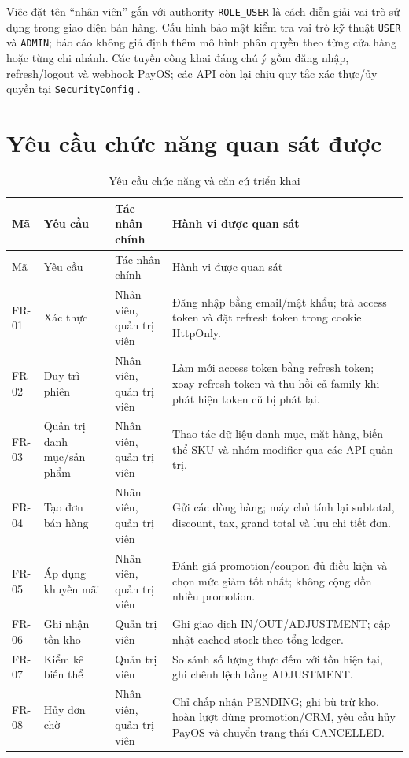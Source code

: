 \documentclass[12pt,a4paper,oneside]{report}
\begin{document}
Việc đặt tên “nhân viên” gắn với authority \texttt{ROLE\_USER} là cách diễn giải vai trò sử dụng trong giao diện bán hàng. Cấu hình bảo mật kiểm tra vai trò kỹ thuật \texttt{USER} và \texttt{ADMIN}; báo cáo không giả định thêm mô hình phân quyền theo từng cửa hàng hoặc từng chi nhánh. Các tuyến công khai đáng chú ý gồm đăng nhập, refresh/logout và webhook PayOS; các API còn lại chịu quy tắc xác thực/ủy quyền tại \texttt{SecurityConfig} \cite{authcode}.

\section{Yêu cầu chức năng quan sát được}
\begin{longtable}{@{}p{1.5cm}p{4.2cm}p{3.0cm}p{6.0cm}@{}}
\caption{Yêu cầu chức năng và căn cứ triển khai}\\
\toprule Mã & Yêu cầu & Tác nhân chính & Hành vi được quan sát\\\midrule
\endfirsthead
\toprule Mã & Yêu cầu & Tác nhân chính & Hành vi được quan sát\\\midrule
\endhead
\bottomrule
\endfoot
FR-01 & Xác thực & Nhân viên, quản trị viên & Đăng nhập bằng email/mật khẩu; trả access token và đặt refresh token trong cookie HttpOnly.\\
FR-02 & Duy trì phiên & Nhân viên, quản trị viên & Làm mới access token bằng refresh token; xoay refresh token và thu hồi cả family khi phát hiện token cũ bị phát lại.\\
FR-03 & Quản trị danh mục/sản phẩm & Nhân viên, quản trị viên & Thao tác dữ liệu danh mục, mặt hàng, biến thể SKU và nhóm modifier qua các API quản trị.\\
FR-04 & Tạo đơn bán hàng & Nhân viên, quản trị viên & Gửi các dòng hàng; máy chủ tính lại subtotal, discount, tax, grand total và lưu chi tiết đơn.\\
FR-05 & Áp dụng khuyến mãi & Nhân viên, quản trị viên & Đánh giá promotion/coupon đủ điều kiện và chọn mức giảm tốt nhất; không cộng dồn nhiều promotion.\\
FR-06 & Ghi nhận tồn kho & Quản trị viên & Ghi giao dịch IN/OUT/ADJUSTMENT; cập nhật cached stock theo tổng ledger.\\
FR-07 & Kiểm kê biến thể & Quản trị viên & So sánh số lượng thực đếm với tồn hiện tại, ghi chênh lệch bằng ADJUSTMENT.\\
FR-08 & Hủy đơn chờ & Nhân viên, quản trị viên & Chỉ chấp nhận PENDING; ghi bù trừ kho, hoàn lượt dùng promotion/CRM, yêu cầu hủy PayOS và chuyển trạng thái CANCELLED.\\

\end{longtable}
\end{document}
